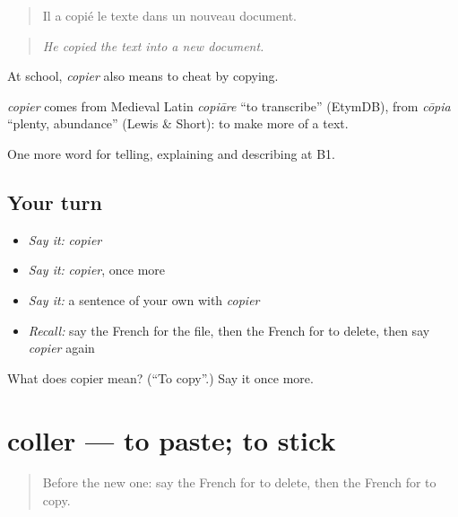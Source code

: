 \begin{quote}
Il a copié le texte dans un nouveau document.
\end{quote}

\begin{quote}
\emph{He copied the text into a new document.}
\end{quote}

At school, \emph{copier} also means to cheat by copying.

\begin{cousinweb}
\emph{copier} comes from Medieval Latin \emph{copiāre} \textquotedblleft{}to transcribe\textquotedblright{} (EtymDB), from \emph{cōpia} \textquotedblleft{}plenty, abundance\textquotedblright{} (Lewis \& Short): to make more of a text.
\end{cousinweb}

\begin{grammarlens}[title={What you've built}]
One more word for telling, explaining and describing at B1.
\end{grammarlens}

\subsection*{Your turn}
\begin{itemize}
\raggedright
  \item \emph{Say it:} \emph{copier}
  \item \emph{Say it:} \emph{copier}, once more
  \item \emph{Say it:} a sentence of your own with \emph{copier}
  \item \emph{Recall:} say the French for the file, then the French for to delete, then say \emph{copier} again
\end{itemize}

\begin{tcolorbox}[breakable,colback=teal!4,colframe=teal!35!black,title={Before you move on}]
What does copier mean? (\textquotedblleft{}To copy\textquotedblright{}.) Say it once more.
\end{tcolorbox}
\section[coller]{coller — to paste; to stick}

\label{lesson:FR-C397-coller}



\begin{quote}
Before the new one: say the French for to delete, then the French for to copy.
\end{quote}

